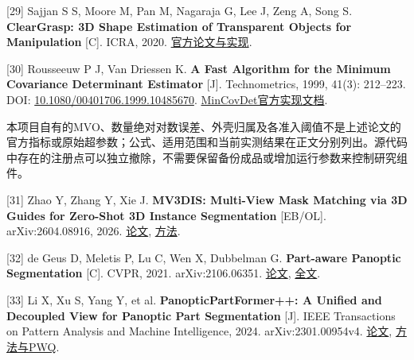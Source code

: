 \documentclass[UTF8,fontset=fandol]{ctexart}
\begin{document}
[29] Sajjan S S, Moore M, Pan M, Nagaraja G, Lee J, Zeng A, Song S. \textbf{ClearGrasp: 3D Shape Estimation of Transparent Objects for Manipulation} [C]. ICRA, 2020. \href{https://github.com/Shreeyak/cleargrasp}{官方论文与实现}.



[30] Rousseeuw P J, Van Driessen K. \textbf{A Fast Algorithm for the Minimum Covariance Determinant Estimator} [J]. Technometrics, 1999, 41(3): 212–223. DOI: \href{https://www.tandfonline.com/doi/abs/10.1080/00401706.1999.10485670}{10.1080/00401706.1999.10485670}. \href{https://scikit-learn.org/1.7/modules/generated/sklearn.covariance.MinCovDet.html}{MinCovDet官方实现文档}.



本项目自有的MVO、数量绝对对数误差、外壳归属及各准入阈值不是上述论文的官方指标或原始超参数；公式、适用范围和当前实测结果在正文分别列出。源代码中存在的注册点可以独立撤除，不需要保留备份成品或增加运行参数来控制研究组件。



[31] Zhao Y, Zhang Y, Xie J. \textbf{MV3DIS: Multi-View Mask Matching via 3D Guides for Zero-Shot 3D Instance Segmentation} [EB/OL]. arXiv:2604.08916, 2026. \href{https://arxiv.org/abs/2604.08916}{论文}, \href{https://arxiv.org/html/2604.08916v1}{方法}.



[32] de Geus D, Meletis P, Lu C, Wen X, Dubbelman G. \textbf{Part-aware Panoptic Segmentation} [C]. CVPR, 2021. arXiv:2106.06351. \href{https://arxiv.org/abs/2106.06351}{论文}, \href{https://arxiv.org/pdf/2106.06351}{全文}.



[33] Li X, Xu S, Yang Y, et al. \textbf{PanopticPartFormer++: A Unified and Decoupled View for Panoptic Part Segmentation} [J]. IEEE Transactions on Pattern Analysis and Machine Intelligence, 2024. arXiv:2301.00954v4. \href{https://arxiv.org/abs/2301.00954}{论文}, \href{https://arxiv.org/html/2301.00954v4}{方法与PWQ}.
\end{document}
